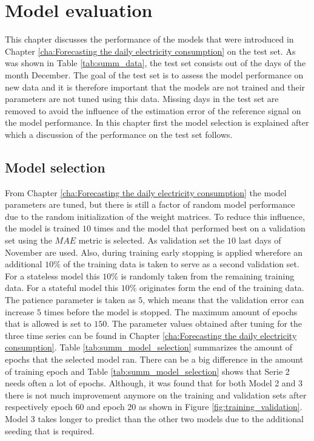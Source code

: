 \chapter{Model evaluation}
\label{cha:Model evaluation}

This chapter discusses the performance of the models that were introduced in Chapter \ref{cha:Forecasting the daily electricity consumption} on the test set. As was shown in Table \ref{tab:summ_data}, the test set consists out of the days of the month December. The goal of the test set is to assess the model performance on new data and it is therefore important that the models are not trained and their parameters are not tuned using this data. Missing days in the test set are removed to avoid the influence of the estimation error of the reference signal on the model performance. In this chapter first the model selection is explained after which a discussion of the performance on the test set follows.

\section{Model selection}\label{s:Model selection}
From Chapter \ref{cha:Forecasting the daily electricity consumption} the model parameters are tuned, but there is still a factor of random model performance due to the random initialization of the weight matrices. To reduce this influence, the model is trained $ 10 $ times and the model that performed best on a validation set using the $ MAE $ metric is selected. As validation set the $ 10 $ last days of November are used. Also, during training early stopping is applied wherefore an additional $ 10\% $ of the training data is taken to serve as a second validation set. For a stateless model this $ 10\% $ is randomly taken from the remaining training data. For a stateful model this $ 10\% $ originates form the end of the training data. The patience parameter is taken as $ 5 $, which means that the validation error can increase $ 5 $ times before the model is stopped. The maximum amount of epochs that is allowed is set to $ 150 $. The parameter values obtained after tuning for the three time series can be found in Chapter \ref{cha:Forecasting the daily electricity consumption}. Table \ref{tab:summ_model_selection} summarizes the amount of epochs that the selected model ran. There can be a big difference in the amount of training epoch and Table \ref{tab:summ_model_selection} shows that Serie 2 needs often a lot of epochs. Although, it was found that for both Model 2 and 3 there is not much improvement anymore on the training and validation sets after respectively epoch $ 60 $ and epoch $ 20 $ as shown in Figure \ref{fig:training_validation}. Model 3 takes longer to predict than the other two models due to the additional seeding that is required.

